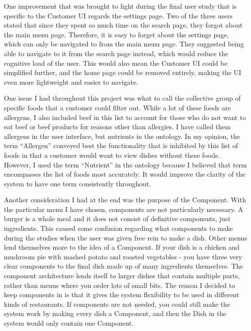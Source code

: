 One improvement that was brought to light during the final user study that is specific to the Customer UI regards the settings page. Two of the three users stated that since they spent so much time on the search page, they forgot about the main menu page. Therefore, it is easy to forget about the settings page, which can only be navigated to from the main menu page. They suggested being able to navigate to it from the search page instead, which would reduce the cognitive load of the user. This would also mean the Customer UI could be simplified further, and the home page could be removed entirely, making the UI even more lightweight and easier to navigate.

One issue I had throughout this project was what to call the collective group of specific foods that a customer could filter out. While a lot of these foods are allergens, I also included beef in this list to account for those who do not want to eat beef or beef products for reasons other than allergies. I have called them allergens in the user interface, but nutrients in the ontology. In my opinion, the term ``Allergen'' conveyed best the functionality that is inhibited by this list of foods in that a customer would want to view dishes without these foods. However, I used the term ``Nutrient'' in the ontology because I believed that term encompasses the list of foods most accurately. It would improve the clarity of the system to have one term consistently throughout. 

Another consideration I had at the end was the purpose of the Component. With the particular menu I have chosen, components are not particularly necessary. A burger is a whole meal and it does not consist of definitive components, just ingredients. This caused some confusion regarding what components to make during the studies when the user was given free rein to make a dish. Other menus lend themselves more to the idea of a Component. If your dish is a chicken and mushroom pie with mashed potato and roasted vegetables - you have three very clear components to the final dish made up of many ingredients themselves. The component architecture lends itself to larger dishes that contain multiple parts, rather than menus where you order lots of small bits. The reason I decided to keep components in is that it gives the system flexibility to be used in different kinds of restaurants. If components are not needed, you could still make the system work by making every dish a Component, and then the Dish in the system would only contain one Component.


